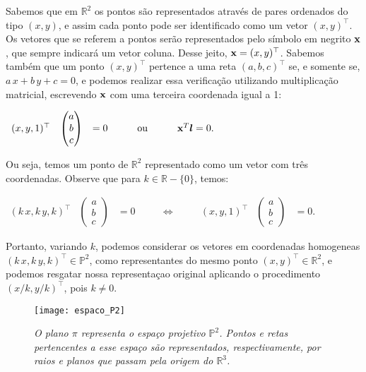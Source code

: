 

Sabemos que em $\mathbb{R}^{2}$ os pontos são representados através de pares ordenados do tipo $(x,y)$, e assim cada ponto pode ser identificado como um vetor $(x,y)^\top$. Os vetores que se referem a pontos serão representados pelo símbolo em negrito $\mathbf{x}$, que sempre indicará um vetor coluna. Desse jeito, $\mathbf{x}=(x,y)^\top$. Sabemos também que um ponto $(x,y)^\top$ pertence a uma reta $(a,b,c)^\top$ se, e somente se, $a\,x+b\,y+c=0$, e podemos realizar essa verificação utilizando multiplicação matricial, escrevendo $\mathbf{x}$ com uma terceira coordenada igual a 1:

\begin{center}
$\begin{array}{ccccc}
 (x,y,1)^\top 
&\begin{pmatrix}
 a  \\ 
 b  \\ 
 c 
 \end{pmatrix} 
& = 0 \qquad 
& \text{ou} 
& \qquad \mathbf{x} ^T\boldsymbol{l} = 0.
\end{array}$
\end{center}

Ou seja, temos um ponto de $\mathbb{R}^{2}$ representado como um vetor com três coordenadas. Observe que para $k \in \mathbb{R} - \{0\}$, temos:

\begin{center}
$\begin{array}{ccccccc}
 (k\,x,k\,y,k)^\top 
&\begin{pmatrix}
 a  \\ 
 b  \\ 
 c 
 \end{pmatrix} 
& = 0
& \qquad \Leftrightarrow \qquad
& (x,y,1)^\top
&\begin{pmatrix}
 a  \\ 
 b  \\ 
 c 
 \end{pmatrix} 
& = 0.
\end{array}$
\end{center}

Portanto,  variando $k$, podemos considerar os vetores em coordenadas homogeneas $(k\,x,k\,y,k)^\top \in \mathbb{P}^2$, como representantes do mesmo ponto $(x,y)^\top \in \mathbb{R}^2$, e podemos resgatar nossa representaçao original aplicando o procedimento $(x/k,y/k)^\top$, pois $k \ne 0$.

\begin{figure}[!htb]
\centering
\texttt{[image: espaco\_P2]}
\caption{\textit{O plano $\pi$ representa o espaço projetivo $\mathbb{P}^2$. Pontos e retas pertencentes a esse espaço são representados, respectivamente, por raios e planos que passam pela origem do $\mathbb{R}^3$.}}
\label{plano_P2}
\end{figure}

